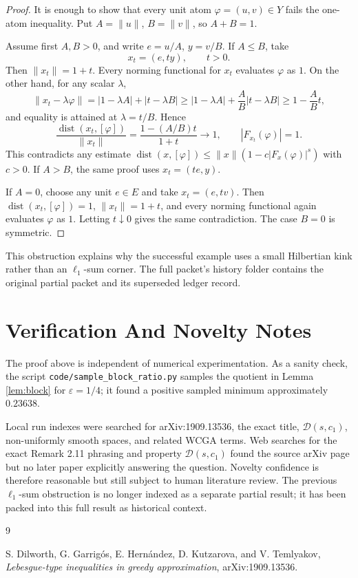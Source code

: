 \documentclass[11pt]{amsart}
\newcommand{\dist}{\operatorname{dist}}
\begin{document}
\begin{proof}
It is enough to show that every unit atom \(\varphi=(u,v)\in Y\) fails the
one-atom inequality. Put \(A=\|u\|\), \(B=\|v\|\), so \(A+B=1\).

Assume first \(A,B>0\), and write \(e=u/A\), \(y=v/B\). If \(A\leq B\), take
\[
  x_t=(e,t y),\qquad t>0.
\]
Then \(\|x_t\|=1+t\). Every norming functional for \(x_t\) evaluates
\(\varphi\) as \(1\). On the other hand, for any scalar \(\lambda\),
\[
  \|x_t-\lambda\varphi\|
  = |1-\lambda A|+|t-\lambda B|
  \geq |1-\lambda A|+\frac AB |t-\lambda B|
  \geq 1-\frac AB t,
\]
and equality is attained at \(\lambda=t/B\). Hence
\[
  \frac{\dist(x_t,[\varphi])}{\|x_t\|}
  =\frac{1-(A/B)t}{1+t}\longrightarrow 1,
  \qquad |F_{x_t}(\varphi)|=1.
\]
This contradicts any estimate
\(\dist(x,[\varphi])\leq \|x\|(1-c|F_x(\varphi)|^s)\) with \(c>0\).
If \(A>B\), the same proof uses \(x_t=(t e,y)\).

If \(A=0\), choose any unit \(e\in E\) and take \(x_t=(e,t v)\). Then
\(\dist(x_t,[\varphi])=1\), \(\|x_t\|=1+t\), and every norming functional
again evaluates \(\varphi\) as \(1\). Letting \(t\downarrow0\) gives the same
contradiction. The case \(B=0\) is symmetric.
\end{proof}

This obstruction explains why the successful example uses a small Hilbertian
kink rather than an \(\ell_1\)-sum corner. The full packet's history folder
contains the original partial packet and its superseded ledger record.

\section*{Verification And Novelty Notes}

The proof above is independent of numerical experimentation. As a sanity
check, the script \texttt{code/sample\_block\_ratio.py} samples the quotient
in Lemma \ref{lem:block} for \(\varepsilon=1/4\); it found a positive sampled
minimum approximately \(0.23638\).

Local run indexes were searched for arXiv:1909.13536, the exact title,
\(\mathcal D(s,c_1)\), non-uniformly smooth spaces, and related WCGA terms.
Web searches for the exact Remark 2.11 phrasing and property
\(\mathcal D(s,c_1)\) found the source arXiv page \cite{DGHKT} but no later
paper explicitly answering the question. Novelty confidence is therefore
reasonable but still subject to human literature review. The previous
\(\ell_1\)-sum obstruction is no longer indexed as a separate partial result;
it has been packed into this full result as historical context.

\begin{thebibliography}{9}

S. Dilworth, G. Garrig\'os, E. Hern\'andez, D. Kutzarova, and V. Temlyakov,
\emph{Lebesgue-type inequalities in greedy approximation},
arXiv:1909.13536.

\end{thebibliography}
\end{document}
